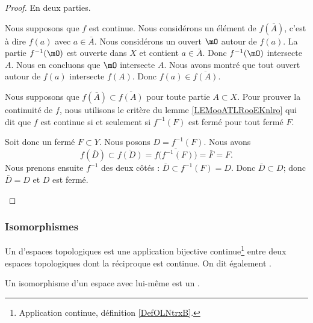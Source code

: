 \begin{proof}
	En deux parties.
	\begin{subproof}
		\spitem[\( \Rightarrow\)]
		Nous supposons que \( f\) est continue. Nous considérons un élément de \( f(\bar A)\), c'est à dire \( f(a)\) avec \( a\in\bar A\). Nous considérons un ouvert \( \mO\) autour de \( f(a)\). La partie \( f^{-1}(\mO)\) est ouverte dans \( X\) et contient \( a\in\bar A\). Donc \( f^{-1}(\mO)\) intersecte \( A\). Nous en concluons que \( \mO\) intersecte \( A\). Nous avons montré que tout ouvert autour de \( f(a)\) intersecte \( f(A)\). Donc \( f(a)\in\overline{f(A)}\).

		\spitem[\( \Leftarrow\)]
		Nous supposons que \( f(\bar A)\subset \overline{f(A)}\) pour toute partie \( A\subset X\). Pour prouver la continuité de \( f\), nous utilisons le critère du lemme \ref{LEMooATLRooEKnlro} qui dit que \( f\) est continue si et seulement si \( f^{-1}(F)\) est fermé pour tout fermé \( F\).

		Soit donc un fermé \( F\subset Y\). Nous posons \( D=f^{-1}(F)\). Nous avons
		\begin{equation}
			f(\bar D)\subset \overline{f(D)}=\overline{f\big( f^{-1}(F) \big)}=\bar F=F.
		\end{equation}
		Nous prenons ensuite \( f^{-1}\) des deux côtés : \( \bar D\subset f^{-1}(F)=D\). Donc \( \bar D\subset D\); donc \( \bar D=D\) et \( D\) est fermé.
	\end{subproof}
\end{proof}


\subsubsection{Isomorphismes}

\begin{definition}      \label{DEFooYPGQooMAObTO}
	Un  d'espaces topologiques est une application bijective continue\footnote{Application continue, définition \ref{DefOLNtrxB}.} entre deux espaces topologiques dont la réciproque est continue. On dit également .

	Un isomorphisme d'un espace avec lui-même est un .
\end{definition}


